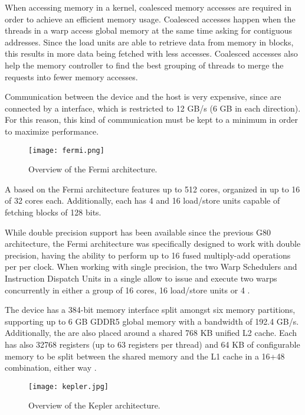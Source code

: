 When accessing memory in a \cuda kernel, coalesced memory accesses are required in order to achieve an efficient memory usage. Coalesced accesses happen when the threads in a warp access global memory at the same time asking for contiguous addresses. Since the load units are able to retrieve data from memory in blocks, this results in more data being fetched with less accesses. Coalesced accesses also help the memory controller to find the best grouping of threads to merge the requests into fewer memory accesses.

Communication between the device and the host \cpu is very expensive, since \gpus are connected by a \pcie interface, which is restricted to 12 GB/s (6 GB in each direction). For this reason, this kind of communication must be kept to a minimum in order to maximize performance.


\begin{figure}
	\begin{center}
		\texttt{[image: fermi.png]}
	\end{center}
	\caption{Overview of the Fermi architecture.}
	\label{fig:fermi}
\end{figure}
A \gpu based on the Fermi architecture features up to 512 \cuda cores, organized in up to 16 \sms of 32 cores each. Additionally, each \sm has 4 \sfus and 16 load/store units capable of fetching blocks of 128 bits.

While double precision support has been available since the previous G80 architecture, the Fermi architecture was specifically designed to work with double precision, having the ability to perform up to 16 fused multiply-add operations per \sm per clock. When working with single precision, the two Warp Schedulers and Instruction Dispatch Units in a single \sm allow to issue and execute two warps concurrently in either a group of 16 cores, 16 load/store units or 4 \sfus.

The device has a 384-bit memory interface split amongst six memory partitions, supporting up to 6 GB GDDR5 global memory with a bandwidth of 192.4 GB/s. Additionally, the \sms are also placed around a shared 768 KB unified L2 cache. Each \sm has also 32768 registers (up to 63 registers per thread) and 64 KB of configurable memory to be split between the shared memory and the L1 cache in a 16+48 combination, either way \cite{NVIDIA:FERMI}.

\begin{figure}[!htp]
	\begin{center}
		\texttt{[image: kepler.jpg]}
	\end{center}
	\caption{Overview of the Kepler architecture.}
	\label{fig:kepler}
\end{figure}

